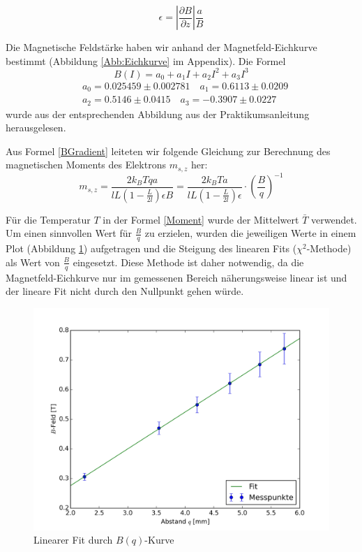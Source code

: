 \documentclass[a4paper,parskip,11pt, DIV12]{scrreprt}
\begin{document}
\begin{equation} \label{BGradient}
\epsilon = \left|\frac{\partial B}{\partial z}\right| \frac{a}{B}
\end{equation}

Die Magnetische Feldstärke haben wir anhand der Magnetfeld-Eichkurve bestimmt (Abbildung \ref{Abb:Eichkurve} im Appendix). Die Formel \begin{equation}
B(I) = a_0 + a_1 I + a_2 I^2 + a_3 I^3
\end{equation} \begin{align*}
&a_0 = 0.025459 \pm 0.002781 \quad
a_1 = 0.6113 \pm 0.0209 \\ 
&a_2 = 0.5146 \pm 0.0415 \quad
a_3 = -0.3907 \pm 0.0227
\end{align*} wurde aus der entsprechenden Abbildung aus der Praktikumsanleitung herausgelesen.

Aus Formel \ref{BGradient} leiteten wir folgende Gleichung zur Berechnung des magnetischen Moments des Elektrons $m_{s,z}$ her:
\begin{equation} \label{Moment}
m_{s,z}=\frac{2k_BTqa}{lL(1-\frac{L}{2l})\epsilon B} = \frac{2k_BTa}{lL(1-\frac{L}{2l})\epsilon} \cdot \left(\frac{B}{q}\right)^{-1}
\end{equation}

Für die Temperatur $T$ in der Formel \ref{Moment} wurde der Mittelwert $\bar{T}$ verwendet. Um einen sinnvollen Wert für $\frac{B}{q}$ zu erzielen, wurden die jeweiligen Werte in einem Plot (Abbildung \ref{Abb:B/q}) aufgetragen und die Steigung des linearen Fits ($\chi^2$-Methode) als Wert von $\frac{B}{q}$ eingesetzt. Diese Methode ist daher notwendig, da die Magnetfeld-Eichkurve nur im gemessenen Bereich näherungsweise linear ist und der lineare Fit nicht durch den Nullpunkt gehen würde.

\begin{figure}[H]
\centering
\includegraphics[scale=0.1]{Plot}
\caption[Plot]{Linearer Fit durch $B(q)$-Kurve}
\label{Abb:B/q}
\end{figure}
\end{document}

